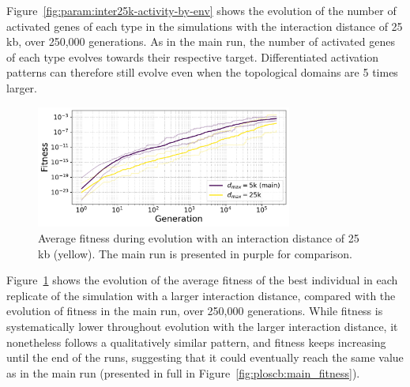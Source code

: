 Figure~\ref{fig:param:inter25k-activity-by-env} shows the evolution of the number of activated genes of each type in the simulations with the interaction distance of 25 kb, over 250,000 generations.
As in the main run, the number of activated genes of each type evolves towards their respective target.
Differentiated activation patterns can therefore still evolve even when the topological domains are 5 times larger.

\begin{figure}[H]
\centering
\includegraphics[width=0.75\textwidth]{param/interaction-25k/fitness_all_with_main.pdf}
\caption[Average fitness during evolution, with an interaction distance of 25 kb]{Average fitness during evolution with an interaction distance of 25 kb (yellow).
The main run is presented in purple for comparison.}
\label{fig:param:inter25k-fitness}
\end{figure}

Figure~\ref{fig:param:inter25k-fitness} shows the evolution of the average fitness of the best individual in each replicate of the simulation with a larger interaction distance, compared with the evolution of fitness in the main run, over 250,000 generations.
While fitness is systematically lower throughout evolution with the larger interaction distance, it nonetheless follows a qualitatively similar pattern, and fitness keeps increasing until the end of the runs, suggesting that it could eventually reach the same value as in the main run (presented in full in Figure~\ref{fig:ploscb:main_fitness}).

